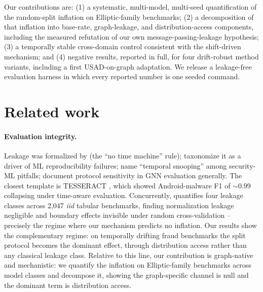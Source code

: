\documentclass[11pt]{article}
\begin{document}
Our contributions are: (1) a systematic, multi-model, multi-seed quantification of
the random-split inflation on Elliptic-family benchmarks; (2) a decomposition of
that inflation into base-rate, graph-leakage, and distribution-access components,
including the measured refutation of our own message-passing-leakage hypothesis;
(3) a temporally stable cross-domain control consistent with the shift-driven
mechanism; and (4) negative results, reported in full, for four drift-robust method variants,
including a first USAD-on-graph adaptation. We release a leakage-free evaluation
harness in which every reported number is one seeded command.

\section{Related work}
\paragraph{Evaluation integrity.} Leakage was formalized by \citet{kaufman2011leakage}
(the ``no time machine'' rule); \citet{kapoor2023leakage} taxonomize it as a driver
of ML reproducibility failures; \citet{arp2022dos} name ``temporal snooping'' among
security-ML pitfalls; \citet{shchur2018pitfalls} document protocol sensitivity in
GNN evaluation generally. The closest template is TESSERACT
\citep{pendlebury2019tesseract}, which showed Android-malware F1 of $\sim$0.99
collapsing under time-aware evaluation. Concurrently, \citet{roth2026leakage}
quantifies four leakage classes across 2{,}047 \emph{iid} tabular benchmarks,
finding normalization leakage negligible and boundary effects invisible under
random cross-validation -- precisely the regime where our mechanism predicts no
inflation. Our results show the complementary regime: on temporally drifting
fraud benchmarks the split protocol becomes the dominant effect, through
distribution access rather than any classical leakage class. Relative to this
line, our contribution is graph-native and mechanistic: we quantify the inflation
on Elliptic-family benchmarks across model classes and decompose it, showing the
graph-specific channel is null and the dominant term is distribution access.
\end{document}
